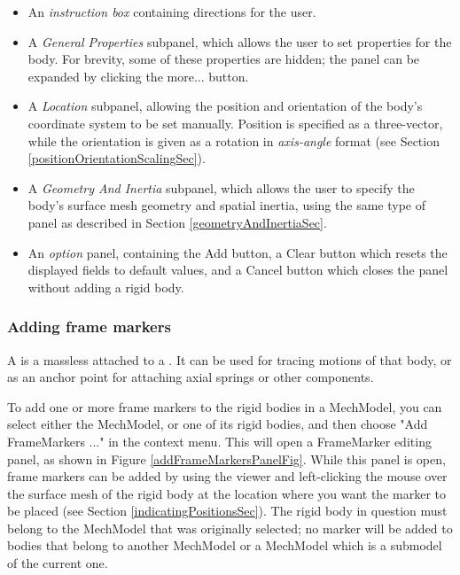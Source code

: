 \documentclass{article}
\begin{document}
\begin{itemize}

\item An {\it instruction box} containing directions for the user.

\item A {\it General Properties} subpanel, which allows the user to set properties
for the body. For brevity, some of these properties are hidden;
the panel can be expanded by clicking the {\sf more...} button.

\item A {\it Location} subpanel, allowing the position and orientation of the
body's coordinate system to be set manually. Position is specified as
a three-vector, while the orientation is given as a rotation in
{\it axis-angle} format (see Section \ref{positionOrientationScalingSec}).

\item A {\it Geometry And Inertia} subpanel, which allows the user to specify the
body's surface mesh geometry and spatial inertia, using the
same type of panel as described in Section \ref{geometryAndInertiaSec}.

\item An {\it option} panel, containing the {\sf Add} button, a {\sf Clear} button
which resets the displayed fields to default values, and a {\sf Cancel}
button which closes the panel without adding a rigid body.

\end{itemize}

\subsubsection{Adding frame markers}
\label{addingFrameMarkersSec}

A  is a massless
 attached to a
. It can be used for tracing
motions of that body, or as an anchor point for attaching axial
springs or other components.

To add one or more frame markers to the rigid bodies in a MechModel,
you can select either the MechModel, or one of its rigid
bodies, and then choose {\sf "Add FrameMarkers ..."} in the context
menu. This will open a FrameMarker editing panel, as shown in
Figure \ref{addFrameMarkersPanelFig}. While this panel is open, frame markers can
be added by using the viewer and left-clicking the mouse over the
surface mesh of the rigid body at the location where you want the
marker to be placed (see Section \ref{indicatingPositionsSec}). The rigid body in
question must belong to the MechModel that was originally selected; no
marker will be added to bodies that belong to another MechModel or a
MechModel which is a submodel of the current one.
\end{document}
